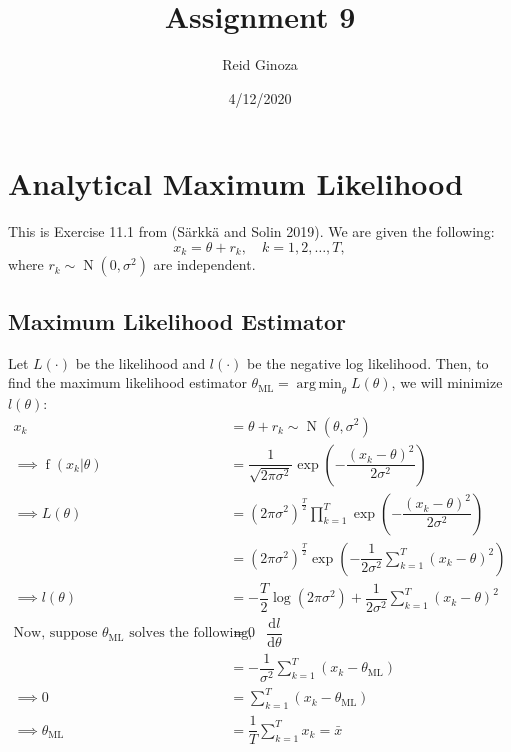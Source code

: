 \documentclass[]{article}
\title{Assignment 9}
\author{Reid Ginoza}
\date{4/12/2020}
\DeclareMathOperator*{\argmin}{arg\,min}
\begin{document}
\maketitle

\hypertarget{analytical-maximum-likelihood}{%
\section{Analytical Maximum
Likelihood}\label{analytical-maximum-likelihood}}

This is Exercise 11.1 from (Särkkä and Solin 2019). We are given the
following: \begin{equation}
x_k = \theta + r_k, \quad k=1, 2, \ldots, T,
\end{equation} where
\(r_k \sim \operatorname{N}{\left( 0, \sigma^2 \right)}\) are
independent.

\hypertarget{maximum-likelihood-estimator}{%
\subsection{Maximum Likelihood
Estimator}\label{maximum-likelihood-estimator}}

Let \(L\left(\cdot\right)\) be the likelihood and
\(l\left(\cdot\right)\) be the negative log likelihood. Then, to find
the maximum likelihood estimator
\(\theta_{\textrm{ML}} = \argmin_{\theta} L\left(\theta\right)\), we
will minimize \(l \left( \theta \right)\): \begin{align}
x_k &= \theta + r_k \sim \operatorname{N}{\left( \theta, \sigma^2 \right)}\\
\implies \operatorname{f}{\left( x_k \vert \theta\right)} &= 
\dfrac{1}{\sqrt{2 \pi \sigma^2}} \exp{\left( - \dfrac{\left( x_k - \theta \right)^2}{2 \sigma^2} \right)}\\
\implies L \left( \theta \right) &= \left( 2 \pi \sigma^2 \right)^{\frac{T}{2}} \prod_{k=1}^{T} \exp{\left( - \dfrac{\left( x_k - \theta \right)^2}{2 \sigma^2} \right)}\\
&= \left( 2 \pi \sigma^2 \right)^{\frac{T}{2}} \exp{\left( - \dfrac{1}{2 \sigma^2} \sum_{k=1}^{T} \left( x_k - \theta \right)^2 \right)}\\
\implies l\left( \theta \right) &= - \dfrac{T}{2} \log{\left( 2 \pi \sigma^2 \right)} + \dfrac{1}{2 \sigma^2} \sum_{k=1}^{T} \left( x_k - \theta \right)^2\\
\text{Now, suppose } \theta_{\textrm{ML}}\text{ solves the following,} \quad \dfrac{\mathrm{d}l}{\mathrm{d}\theta} &= 0\\
&= - \dfrac{1}{\sigma^2} \sum_{k=1}^{T} \left( x_k - \theta_{\textrm{ML}} \right)\\
\implies 0 &= \sum_{k=1}^{T} \left( x_k - \theta_{\textrm{ML}} \right)\\
\implies \theta_{\textrm{ML}} &= \dfrac{1}{T} \sum_{k=1}^{T} x_k = \bar{x}
\end{align}
\end{document}
